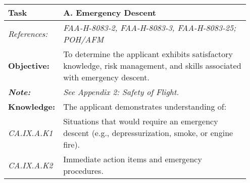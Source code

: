 {\begin{table}[H]
\begin{tabular}%
  {>{\raggedleft\arraybackslash}p{0.15\linewidth}%
   >{\raggedright\arraybackslash}p{0.8\linewidth}%
  }
\textbf{Task}                                                       & \textbf{A. Emergency Descent}                                                                                                                                                                                                       \\ \hline
\textit{References:}                                                & \textit{FAA-H-8083-2, FAA-H-8083-3, FAA-H-8083-25; POH/AFM}                                                                                                                                                                         \\
\textbf{Objective:}                                                 & To determine the applicant exhibits satisfactory knowledge, risk management, and skills associated with emergency descent.                                                                                                          \\
\textit{\textbf{Note:}}                                             & \textit{See Appendix 2: Safety of Flight.}                                                                                                                                                                                          \\ \hline
\textbf{Knowledge:}                                                 & The applicant demonstrates understanding of:                                                                                                                                                                                        \\
\textit{CA.IX.A.K1}                                                 & Situations that would require an emergency descent (e.g., depressurization, smoke, or engine fire).                                                                                                                                 \\
\textit{CA.IX.A.K2}                                                 & Immediate action items and emergency procedures.                                                                                                                                                                                    \\

\end{tabular}
\end{table}}

